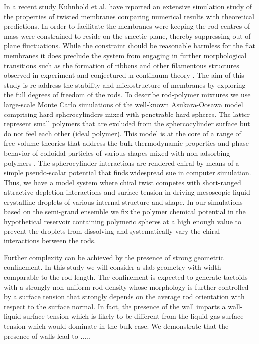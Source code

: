 In a recent study Kuhnhold et al. \cite{kuhnhold2022colloidal} have reported an extensive simulation study of the properties of twisted membranes comparing numerical results with theoretical predictions. In order to facilitate the membranes were keeping the rod centres-of-mass were constrained to reside on the smectic plane, thereby suppressing out-of-plane fluctuations. While the constraint should be reasonable harmless for the flat membranes it does preclude the system from engaging in further morphological transitions such as the formation of ribbons and other filamentous structures observed in experiment \cite{Gibaud2014} and conjectured in continuum theory \cite{kaplan2010theory,kang_sm2016}. The aim of this study is re-address the stability and microstructure of membranes by exploring the full degrees of freedom of the rods. To describe rod-polymer mixtures we use large-scale Monte Carlo simulations of the well-known Asukara-Oosawa model comprising hard-spherocylinders mixed with penetrable hard spheres. The latter represent small polymers that are excluded from the sphercocylinder surface but do not feel each other (ideal polymer). This model is at the core of a range of free-volume theories that address the bulk thermodynamic properties and phase behavior of colloidal particles of  various shapes mixed with non-adsorbing polymers \cite{lektuin2011}. The spherocylinder interactions are rendered chiral by means of a simple pseudo-scalar potential that finds widespread sue in computer simulation. Thus, we have a model system where chiral twist competes with short-ranged attractive depletion interactions and surface tension in driving mesoscopic liquid crystalline droplets of various internal structure and shape.  In our simulations based on the semi-grand ensemble we fix the polymer chemical potential in the hypothetical reservoir containing polymeric spheres at a high enough value to prevent the droplets from dissolving and systematically vary the chiral interactions between the rods. 

Further complexity can be achieved by the presence of strong geometric confinement.  In this study we will consider a slab geometry with width comparable to the rod length. The confinement is expected to generate tactoids with a strongly non-uniform rod density whose morphology is further controlled by a surface tension that strongly depends on the average rod orientation with respect to the surface normal. In fact, the presence of the wall imparts a wall-liquid surface tension which is likely to be different from the liquid-gas surface tension which would dominate in the bulk case. We demonstrate that the presence of walls lead to .....



